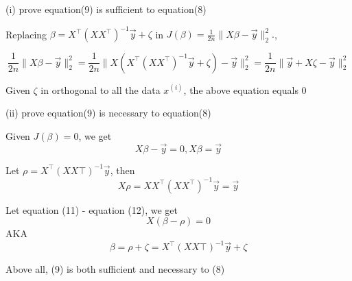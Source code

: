 \begin{answer} 

(i) prove equation(9) is sufficient to equation(8)

Replacing $\beta=X^\top (XX^\top)^{-1}\vec{y}+\zeta $ in  $J(\beta)=\frac{1}{2n}\|X\beta-\vec{y}\|_2^2.$,

\begin{equation}
    \frac{1}{2n}\|X\beta-\vec{y}\|_2^2 =  \frac{1}{2n}\|X\left(X^\top (XX^\top)^{-1}\vec{y}+\zeta\right)-\vec{y}\|_2^2 = \frac{1}{2n}\|\vec{y}+X\zeta-\vec{y}\|_2^2
\end{equation}

Given $\zeta$ in orthogonal to all the data $x^{(i)}$, the above equation equals 0

(ii) prove equation(9) is necessary to equation(8)

Given $J(\beta) = 0$, we get 
\begin{equation}
    X\beta-\vec{y} = 0,  X\beta = \vec{y}
\end{equation}

Let $\rho = X^\top(X X\top)^{-1}\vec{y}$, then 
\begin{equation}
    X\rho = X X^\top(X X^\top)^{-1}\vec{y} = \vec{y}
\end{equation}

Let equation (11) - equation (12), we get
\begin{equation}
    X(\beta - \rho) = 0
\end{equation}
AKA 
\begin{equation}
    \beta = \rho + \zeta = X^\top(X X\top)^{-1}\vec{y} + \zeta
\end{equation}

Above all, (9) is both sufficient and necessary to (8)

\end{answer}
